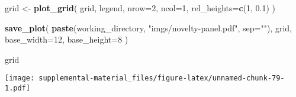 \documentclass[]{book}
\newenvironment{Shaded}{\begin{snugshade}}{\end{snugshade}}
\newcommand{\DataTypeTok}[1]{\textcolor[rgb]{0.13,0.29,0.53}{#1}}
\newcommand{\DecValTok}[1]{\textcolor[rgb]{0.00,0.00,0.81}{#1}}
\newcommand{\FloatTok}[1]{\textcolor[rgb]{0.00,0.00,0.81}{#1}}
\newcommand{\KeywordTok}[1]{\textcolor[rgb]{0.13,0.29,0.53}{\textbf{#1}}}
\newcommand{\NormalTok}[1]{#1}
\newcommand{\StringTok}[1]{\textcolor[rgb]{0.31,0.60,0.02}{#1}}
\begin{document}
\begin{Shaded}
\begin{Highlighting}[]
\NormalTok{grid <-}\StringTok{ }\KeywordTok{plot_grid}\NormalTok{(}
\NormalTok{  grid,}
\NormalTok{  legend,}
  \DataTypeTok{nrow=}\DecValTok{2}\NormalTok{,}
  \DataTypeTok{ncol=}\DecValTok{1}\NormalTok{,}
  \DataTypeTok{rel_heights=}\KeywordTok{c}\NormalTok{(}\DecValTok{1}\NormalTok{, }\FloatTok{0.1}\NormalTok{)}
\NormalTok{)}

\KeywordTok{save_plot}\NormalTok{(}
  \KeywordTok{paste}\NormalTok{(working_directory, }\StringTok{"imgs/novelty-panel.pdf"}\NormalTok{, }\DataTypeTok{sep=}\StringTok{""}\NormalTok{),}
\NormalTok{  grid,}
  \DataTypeTok{base_width=}\DecValTok{12}\NormalTok{,}
  \DataTypeTok{base_height=}\DecValTok{8}
\NormalTok{)}

\NormalTok{grid}
\end{Highlighting}
\end{Shaded}

\texttt{[image: supplemental-material\_files/figure-latex/unnamed-chunk-79-1.pdf]}


\end{document}
